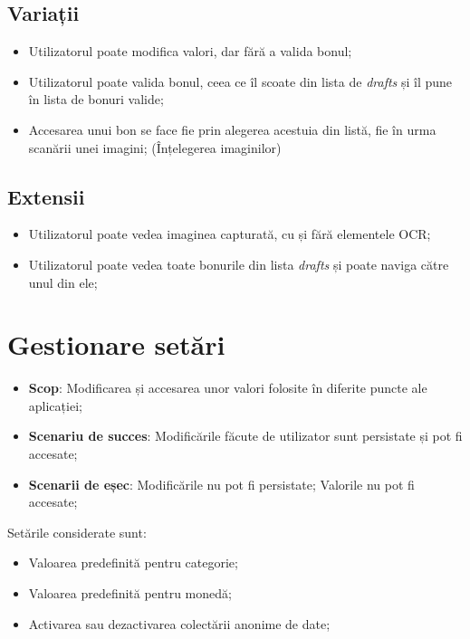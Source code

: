 \subsection{Variații}\label{variaux21bii-1}

\begin{itemize}
\item
  Utilizatorul poate modifica valori, dar fără a valida bonul;
\item
  Utilizatorul poate valida bonul, ceea ce îl scoate din lista de \emph{drafts} și îl pune în lista de bonuri valide;
\item
  Accesarea unui bon se face fie prin alegerea acestuia din listă, fie în urma scanării unei imagini; (Înțelegerea imaginilor)
\end{itemize}

\subsection{Extensii}\label{extensii-1}

\begin{itemize}
\item
  Utilizatorul poate vedea imaginea capturată, cu și fără elementele OCR;
\item
  Utilizatorul poate vedea toate bonurile din lista \emph{drafts} și poate naviga către unul din ele;
\end{itemize}

\section{Gestionare setări}\label{gestionare-setux103ri}

\begin{itemize}
\item
  \textbf{Scop}: Modificarea și accesarea unor valori folosite în diferite puncte ale aplicației;
\item
  \textbf{Scenariu de succes}: Modificările făcute de utilizator sunt persistate și pot fi accesate;
\item
  \textbf{Scenarii de eșec}: Modificările nu pot fi persistate; Valorile nu pot fi accesate;
\end{itemize}

Setările considerate sunt:

\begin{itemize}
\item
  Valoarea predefinită pentru categorie;
\item
  Valoarea predefinită pentru monedă;
\item
  Activarea sau dezactivarea colectării anonime de date;
\end{itemize}

